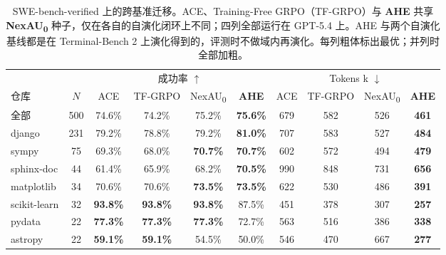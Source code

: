 \begin{table}[t]
    \centering
    \small
    \setlength{\tabcolsep}{5pt}
    \renewcommand{\arraystretch}{1.05}
    \caption{SWE-bench-verified 上的跨基准迁移。ACE、Training-Free GRPO（TF-GRPO）与 \textbf{AHE} 共享 \textbf{NexAU\textsubscript{0}} 种子，仅在各自的自演化闭环上不同；四列全部运行在 GPT-5.4 上。AHE 与两个自演化基线都是在 Terminal-Bench 2 上演化得到的，评测时不做域内再演化。每列粗体标出最优；并列时全部加粗。}
    \label{tab:swe-verified-analysis}
    \begin{tabular}{lc @{\hspace{10pt}} cccc @{\hspace{10pt}} cccc}
        \toprule
         &  & \multicolumn{4}{c}{成功率 $\uparrow$} & \multicolumn{4}{c}{Tokens k $\downarrow$} \\
        \cmidrule(lr){3-6} \cmidrule(lr){7-10}
        仓库 & $N$
        & ACE & TF-GRPO & NexAU\textsubscript{0} & \textbf{AHE}
        & ACE & TF-GRPO & NexAU\textsubscript{0} & \textbf{AHE} \\
        \midrule
        全部            & 500 & 74.6\% & 74.2\% & 75.2\% & \textbf{75.6\%} & 679 & 582 & 526 & \textbf{461} \\
        \midrule
        django         & 231 & 79.2\% & 78.8\% & 79.2\% & \textbf{81.0\%} & 707 & 583 & 527 & \textbf{484} \\
        sympy          &  75 & 69.3\% & 68.0\% & \textbf{70.7\%} & \textbf{70.7\%} & 602 & 572 & 494 & \textbf{479} \\
        sphinx-doc     &  44 & 61.4\% & 65.9\% & 68.2\% & \textbf{70.5\%} & 990 & 848 & 731 & \textbf{656} \\
        matplotlib     &  34 & 70.6\% & 70.6\% & \textbf{73.5\%} & \textbf{73.5\%} & 622 & 530 & 486 & \textbf{391} \\
        scikit-learn   &  32 & \textbf{93.8\%} & \textbf{93.8\%} & \textbf{93.8\%} & 87.5\% & 451 & 378 & 307 & \textbf{257} \\
        pydata         &  22 & \textbf{77.3\%} & \textbf{77.3\%} & \textbf{77.3\%} & 72.7\% & 563 & 516 & 386 & \textbf{338} \\
        astropy        &  22 & \textbf{59.1\%} & \textbf{59.1\%} & 54.5\% & 50.0\% & 546 & 470 & 667 & \textbf{277} \\
        \bottomrule
    \end{tabular}
\end{table}
